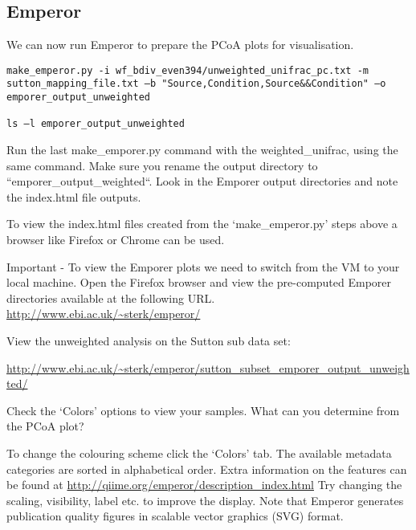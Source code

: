 \subsection{Emperor}
\begin{steps}
We can now run Emperor to prepare the PCoA plots for visualisation.

\begin{lstlisting}
make_emperor.py -i wf_bdiv_even394/unweighted_unifrac_pc.txt -m sutton_mapping_file.txt –b "Source,Condition,Source&&Condition" –o emporer_output_unweighted
 
ls –l emporer_output_unweighted
\end{lstlisting}
\end{steps}

\begin{steps}
Run the last make\_emporer.py command with the weighted\_unifrac, using the same command. Make sure you rename the output directory to “emporer\_output\_weighted“. Look in the Emporer output directories and note the index.html file outputs.
\end{steps}

To view the index.html files created from the ‘make\_emperor.py’ steps above a browser like Firefox or Chrome can be used. 

\begin{steps}
Important - To view the Emporer plots we need to switch from the VM to your local machine.
Open the Firefox browser and view the pre-computed Emporer directories available at the following URL. \url{http://www.ebi.ac.uk/~sterk/emperor/}
\end{steps}

View the unweighted analysis on the Sutton sub data set:
\begin{steps}
\url{http://www.ebi.ac.uk/~sterk/emperor/sutton_subset_emporer_output_unweighted/}
\end{steps}


\begin{questions}
Check the ‘Colors’ options to view your samples. 
What can you determine from the PCoA plot?
\begin{answer}

\end{answer}
\end{questions}

\begin{information}
To change the colouring scheme click the ‘Colors’ tab. The available metadata categories are sorted in alphabetical order. Extra information on the features can be found at \url{http://qiime.org/emperor/description_index.html}
Try changing the scaling, visibility, label etc. to improve the display.
Note that Emperor generates publication quality figures in scalable vector graphics (SVG) format.
\end{information}

